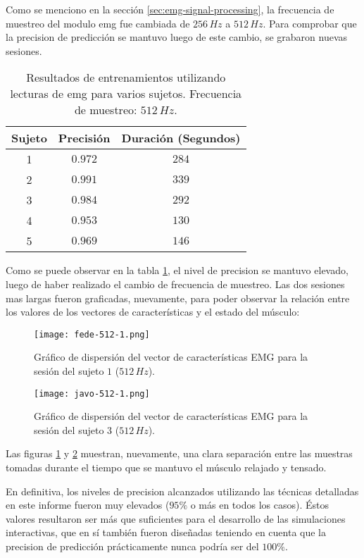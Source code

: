 Como se menciono en la sección \ref{sec:emg-signal-processing}, la frecuencia de muestreo del modulo \acrshort{emg} fue cambiada de $256\,Hz$ a $512\,Hz$. Para comprobar que la precision de predicción se mantuvo luego de este cambio, se grabaron nuevas sesiones.

\begin{table}[H]
\centering
\begin{tabular}{ |c|c|c| } 
 \hline
 Sujeto & Precisión & Duración (Segundos) \\ 
 \hline
 1 & $0.972$ & $284$ \\
 \hline
 2 & $0.991$ & $339$ \\
 \hline
 3 & $0.984$ & $292$ \\
 \hline
 4 & $0.953$ & $130$ \\
 \hline
 5 & $0.969$ & $146$ \\

 \hline
\end{tabular}
\caption{Resultados de entrenamientos utilizando lecturas de \acrshort{emg} para varios sujetos. Frecuencia de muestreo: $512\,Hz$.}
\label{tab:emg-results-512}
\end{table}
	
Como se puede observar en la tabla \ref{tab:emg-results-512}, el nivel de precision se mantuvo elevado, luego de haber realizado el cambio de frecuencia de muestreo. Las dos sesiones mas largas fueron graficadas, nuevamente, para poder observar la relación entre los valores de los vectores de características y el estado del músculo:

\begin{figure}[H]
	\centering
    \texttt{[image: fede-512-1.png]}
    \caption{Gráfico de dispersión del vector de características EMG para la sesión del sujeto $1$ ($512\,Hz$).}
	\label{fig:emg-graph-s1-512}
\end{figure}

\begin{figure}[H]
	\centering
    \texttt{[image: javo-512-1.png]}
    \caption{Gráfico de dispersión del vector de características EMG para la sesión del sujeto $3$ ($512\,Hz$).}
	\label{fig:emg-graph-s3-512}
\end{figure}

Las figuras \ref{fig:emg-graph-s1-512} y \ref{fig:emg-graph-s3-512} muestran, nuevamente, una clara separación entre las muestras tomadas durante el tiempo que se mantuvo el músculo relajado y tensado.

En definitiva, los niveles de precision alcanzados utilizando las técnicas detalladas en este informe fueron muy elevados ($95\%$ o más en todos los casos). Éstos valores resultaron ser más que suficientes para el desarrollo de las simulaciones interactivas, que en sí también fueron diseñadas teniendo en cuenta que la precision de predicción prácticamente nunca podría ser del $100\%$.

